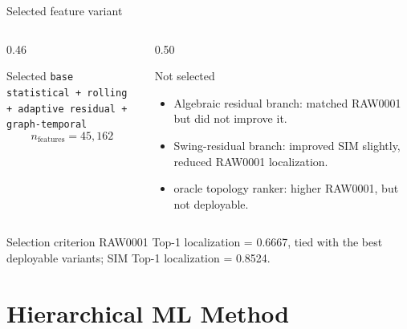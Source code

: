 ﻿\documentclass[10pt,aspectratio=169]{beamer}
\begin{document}
\fi
\begin{frame}{Selected feature variant}
\small
\begin{columns}[T,totalwidth=\textwidth]
\begin{column}{0.46\textwidth}
\begin{block}{Selected}
\centering
{\scriptsize\texttt{base statistical + rolling}}\\[-1mm]
{\scriptsize\texttt{+ adaptive residual + graph-temporal}}\\[1mm]
\[
n_{\mathrm{features}} = 45{,}162
\]
\end{block}
\end{column}
\begin{column}{0.50\textwidth}
\begin{alertblock}{Not selected}
\begin{itemize}
  \item Algebraic residual branch: matched RAW0001 but did not improve it.
  \item Swing-residual branch: improved SIM slightly, reduced RAW0001 localization.
  \item oracle topology ranker: higher RAW0001, but not deployable.
\end{itemize}
\end{alertblock}
\end{column}
\end{columns}
\vspace{2mm}
\begin{exampleblock}{Selection criterion}
RAW0001 Top-1 localization = 0.6667, tied with the best deployable variants; SIM Top-1 localization = 0.8524.
\end{exampleblock}
\end{frame}

\section{Hierarchical ML Method}
\end{document}
